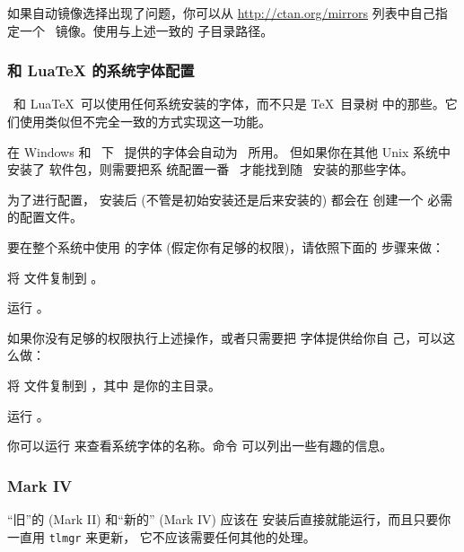 \documentclass{article}
\begin{document}
如果自动镜像选择出现了问题，你可以从 \url{http://ctan.org/mirrors}
列表中自己指定一个 \CTAN\ 镜像。使用与上述一致的 
子目录路径。

\subsubsection{\XeTeX{} 和 Lua\TeX{} 的系统字体配置}
\label{sec:font-conf-sys}

\XeTeX\ 和 Lua\TeX\ 可以使用任何系统安装的字体，而不只是 \TeX\ 目录树
中的那些。它们使用类似但不完全一致的方式实现这一功能。

在 Windows 和 \MacOSX\ 下 \TL\ 提供的字体会自动为 \XeTeX\ 所用。
但如果你在其他 Unix 系统中安装了  软件包，则需要把系
统配置一番 \XeTeX\ 才能找到随 \TL\ 安装的那些字体。

为了进行配置， 安装后 (不管是初始安装还是后来安装的) 都会在
 创建一个
必需的配置文件。

要在整个系统中使用 \TL{} 的字体 (假定你有足够的权限)，请依照下面的
步骤来做：
\begin{enumerate*}
\item 将  文件复制到
。
\item 运行 。
\end{enumerate*}

如果你没有足够的权限执行上述操作，或者只需要把 \TL{} 字体提供给你自
己，可以这么做：
\begin{enumerate*}
\item 将  文件复制到
      ，其中 \filename{~} 是你的主目录。
\item 运行 。
\end{enumerate*}

你可以运行  来查看系统字体的名称。命令
 可以列出一些有趣的信息。

\subsubsection{\ConTeXt{} Mark IV}
\label{sec:context-mkiv}

“旧”的 \ConTeXt{} (Mark II) 和“新的” \ConTeXt{} (Mark IV)
应该在 \TL{} 安装后直接就能运行，而且只要你一直用 \verb+tlmgr+ 来更新，
它不应该需要任何其他的处理。
\end{document}
